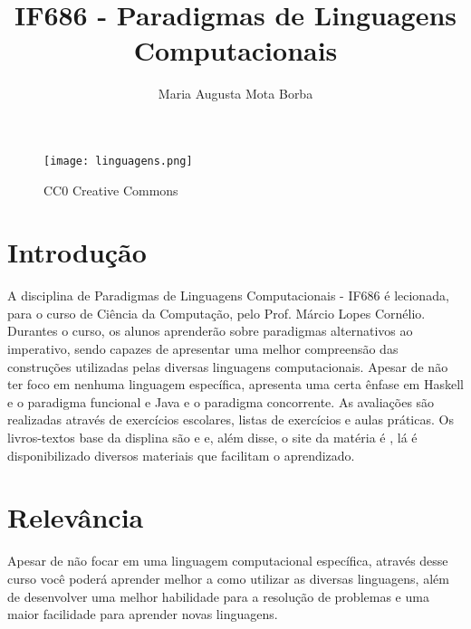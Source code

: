 \documentclass[10pt,a4paper]{article}
\title{IF686 - Paradigmas de Linguagens Computacionais}
\author{Maria Augusta Mota Borba}
\begin{document}
\maketitle

\begin{figure}[h]
\centering
\texttt{[image: linguagens.png]}
\caption{\label{fig:linguagens.png}CC0 Creative Commons}
\end{figure}


\section{Introdução}

A disciplina de Paradigmas de Linguagens Computacionais - IF686 é lecionada, para o curso de Ciência da Computação, pelo Prof. Márcio Lopes Cornélio. Durantes o curso, os alunos aprenderão sobre paradigmas alternativos ao imperativo, sendo capazes de apresentar uma melhor compreensão das construções utilizadas pelas diversas linguagens computacionais. Apesar de não ter foco em nenhuma linguagem específica, apresenta uma certa ênfase em Haskell e o paradigma funcional e Java e o paradigma concorrente. As avaliações são realizadas através de exercícios escolares, listas de exercícios e aulas práticas. Os livros-textos base da displina são \cite{JavaConcurrencyinPractice} e \cite{LearnYouAHaskellForGreatGood} e, além disse, o site da matéria é \cite{SiteCadeira}, lá é disponibilizado diversos materiais que facilitam o aprendizado.

\section{Relevância}

Apesar de não focar em uma linguagem computacional específica, através desse curso você poderá aprender melhor a como utilizar as diversas linguagens, além de desenvolver uma melhor habilidade para a resolução de problemas e uma maior facilidade para aprender novas linguagens. 
\end{document}
